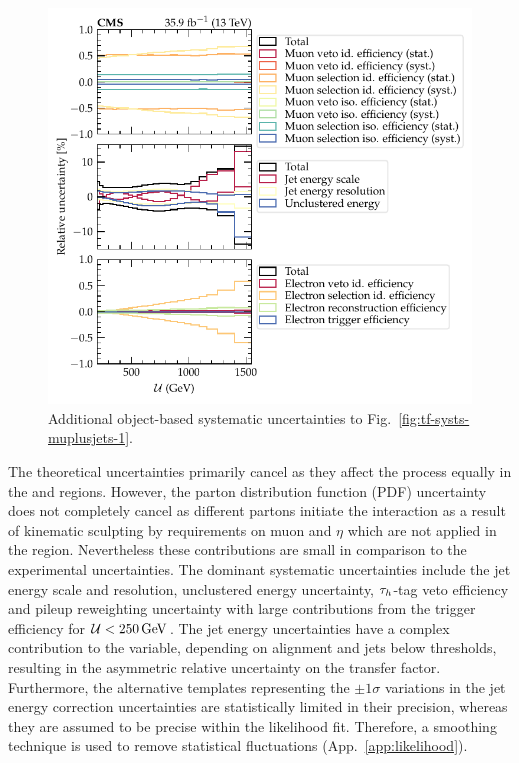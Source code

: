 %
\begin{figure}
    \centering
    \includegraphics{chapters/042_backgrounds/images/tf_wj_mu_met_systs2.pdf}
    \caption[Object-based uncertainties on the transfer factors]{
        Additional object-based systematic uncertainties to Fig.~\ref{fig:tf-systs-muplusjets-1}.
    }
    \label{fig:tf-systs-muplusjets-2}
\end{figure}
%
The theoretical uncertainties primarily cancel as they affect the \IWj process
equally in the \metplusjets and \muplusjets regions. However, the parton
distribution function (PDF) uncertainty does not completely cancel as
different partons initiate the interaction as a result of kinematic sculpting
by requirements on muon \pt and $\eta$ which are not applied in the
\metplusjets region. Nevertheless these contributions are small in comparison
to the experimental uncertainties. The dominant systematic uncertainties
include the jet energy scale and resolution, unclustered energy uncertainty,
$\tau_h$-tag veto efficiency and pileup reweighting uncertainty with large
contributions from the \ptmiss trigger efficiency for
${\mathcal{U}<\SI{250}{GeV}}$. The jet energy uncertainties have a complex
contribution to the \recoil variable, depending on alignment and jets below
thresholds, resulting in the asymmetric relative uncertainty on the transfer
factor. Furthermore, the alternative templates representing the $\pm 1\sigma$ variations in the jet energy correction uncertainties are statistically limited in their precision, whereas they are assumed to be precise within the likelihood fit. Therefore, a smoothing technique is used to remove statistical fluctuations (App.~\ref{app:likelihood}).

